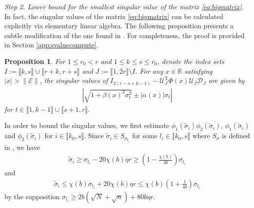 \documentclass[reqno]{amsart}
\newcommand{\T}{\mathrm{T}}
\theoremstyle{plain}
\newtheorem{proposition}[theorem]{Proposition}
\theoremstyle{definition}
\begin{document}
\noindent\emph{Step 2. Lower bound for the smallest singular value of the matrix \eqref{eq:bigmatrix}}. 
In fact, the singular values of the matrix \eqref{eq:bigmatrix} can be calculated explicitly via elementary linear algebra. The following proposition presents a subtle modification of the one found in \cite[Proposition 10]{OVW2}.  For completeness, the proof is provided in Section \ref{app:svaluecompute}.
\begin{proposition}\label{prop:blockphi}For $1\le r_0 < r$ and $1\le k \le s \leq r_0$, denote the index sets $I:=\llbracket k, s\rrbracket \cup \llbracket r+k, r+s\rrbracket$ and $J:=\llbracket 1, 2r\rrbracket\setminus I$. For any $x\in \mathbb R$ satisfying $|x|>\|\mathcal E\|$, the singular values of $I_{2(r-s+k-1)} -\mathcal U_J^\T \Phi(x) {\mathcal U}_J \mathcal D_J$ are given by
\begin{align*}
\left|\sqrt{1+\beta(x)^2 \sigma_t^2} \pm |\alpha(x)| \sigma_t \right|
\end{align*}
for $t\in \llbracket 1, k-1\rrbracket \cup \llbracket s+1, r\rrbracket$.
\end{proposition}
In order to bound the singular values, we first estimate $\phi_1(\widetilde\sigma_i)\phi_2(\widetilde\sigma_i)$, $\phi_1(\widetilde\sigma_i)$ and $\phi_2(\widetilde\sigma_i)$ for $ i\in \llbracket k_0, s\rrbracket$. Since $\widetilde \sigma_i \in S_{\sigma_{l_i}}$ for some $l_i\in \llbracket k_0, s\rrbracket$ where $S_{\sigma}$ is defined in \cite[Eq. (35)]{Wang24}, we have 
\begin{align}\label{eq:lowerbdsv}
 \widetilde \sigma_i \ge \sigma_{l_i} -20\chi(b)\eta r \ge \left( 1-\frac{\chi(b)}{4b} \right)\sigma_{l_i}
 \end{align}
and
\begin{align}\label{eq:upperbdsv}
 \widetilde \sigma_i \le \chi(b)\sigma_{l_i} + 20\chi(b) \eta r \le  \chi(b)\left( 1+\frac{1}{4b} \right)\sigma_{l_i}
 \end{align}
 by the supposition $\sigma_{l_i} \ge 2b(\sqrt N+\sqrt n) + 80b\eta r$. 
\end{document}
